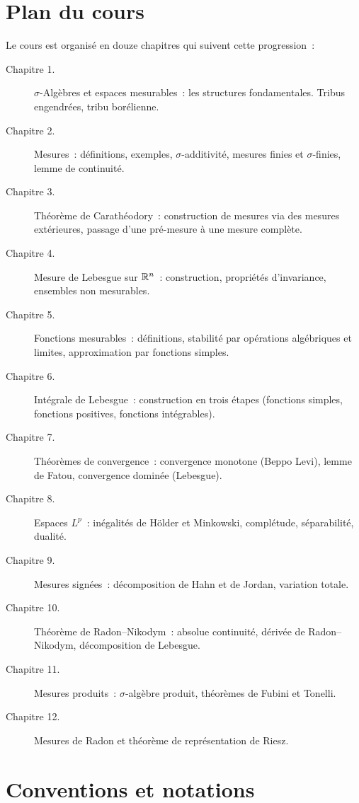 \section*{Plan du cours}

Le cours est organis\'e en douze chapitres qui suivent cette progression~:

\begin{description}
    \item[Chapitre 1.] $\sigma$-Alg\`ebres et espaces mesurables~: les structures
    fondamentales. Tribus engendr\'ees, tribu bor\'elienne.
    \item[Chapitre 2.] Mesures~: d\'efinitions, exemples, $\sigma$-additivit\'e,
    mesures finies et $\sigma$-finies, lemme de continuit\'e.
    \item[Chapitre 3.] Th\'eor\`eme de Carath\'eodory~: construction de mesures via
    des mesures ext\'erieures, passage d'une pr\'e-mesure \`a une mesure compl\`ete.
    \item[Chapitre 4.] Mesure de Lebesgue sur $\mathbb{R}^n$~: construction,
    propri\'et\'es d'invariance, ensembles non mesurables.
    \item[Chapitre 5.] Fonctions mesurables~: d\'efinitions, stabilit\'e par
    op\'erations alg\'ebriques et limites, approximation par fonctions simples.
    \item[Chapitre 6.] Int\'egrale de Lebesgue~: construction en trois \'etapes
    (fonctions simples, fonctions positives, fonctions int\'egrables).
    \item[Chapitre 7.] Th\'eor\`emes de convergence~: convergence monotone (Beppo
    Levi), lemme de Fatou, convergence domin\'ee (Lebesgue).
    \item[Chapitre 8.] Espaces $L^p$~: in\'egalit\'es de H\"older et Minkowski,
    compl\'etude, s\'eparabilit\'e, dualit\'e.
    \item[Chapitre 9.] Mesures sign\'ees~: d\'ecomposition de Hahn et de Jordan,
    variation totale.
    \item[Chapitre 10.] Th\'eor\`eme de Radon--Nikodym~: absolue continuit\'e,
    d\'eriv\'ee de Radon--Nikodym, d\'ecomposition de Lebesgue.
    \item[Chapitre 11.] Mesures produits~: $\sigma$-alg\`ebre produit,
    th\'eor\`emes de Fubini et Tonelli.
    \item[Chapitre 12.] Mesures de Radon et th\'eor\`eme de repr\'esentation de Riesz.
\end{description}

\section*{Conventions et notations}

